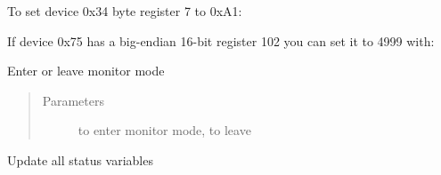 \begin{fulllineitems}
\begin{fulllineitems}
\begin{quote}
\begin{description}
\end{description}\end{quote}

To set device 0x34 byte register 7 to 0xA1:

\begin{sphinxVerbatim}[commandchars=\\\{\}]
  \PYG{p}{[}\PYG{p}{]}
\end{sphinxVerbatim}

If device 0x75 has a big-endian 16-bit register 102 you can set it to 4999 with:

\begin{sphinxVerbatim}[commandchars=\\\{\}]
   
\end{sphinxVerbatim}

\end{fulllineitems}


\begin{fulllineitems}
\label{\detokenize{index:i2cdriver.I2CDriver.monitor}}
Enter or leave monitor mode
\begin{quote}\begin{description}
\item[{Parameters}] \leavevmode
{} \textendash{}  to enter monitor mode,  to leave

\end{description}\end{quote}

\end{fulllineitems}


\begin{fulllineitems}
\label{\detokenize{index:i2cdriver.I2CDriver.getstatus}}
Update all status variables

\end{fulllineitems}


\end{fulllineitems}


